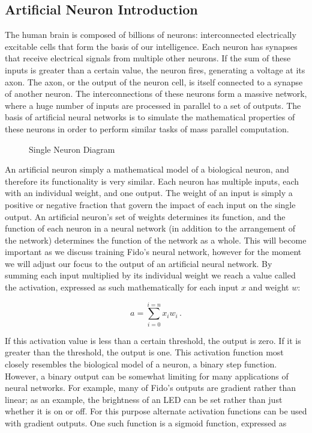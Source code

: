 \subsection{Artificial Neuron Introduction}


The human brain is composed of billions of neurons: interconnected electrically excitable cells that form the basis of our intelligence.  Each neuron has synapses that receive electrical signals from multiple other neurons.  If the sum of these inputs is greater than a certain value, the neuron fires, generating a voltage at its axon.  The axon, or the output of the neuron cell, is itself connected to a synapse of another neuron.  The interconnections of these neurons form a massive network, where a huge number of inputs are processed in parallel to a set of outputs.  The basis of artificial neural networks is to simulate the mathematical properties of these neurons in order to perform similar tasks of mass parallel computation.

\begin{figure}
	\centering
	
	\caption{Single Neuron Diagram}
\end{figure}

An artificial neuron simply a mathematical model of a biological neuron, and therefore its functionality is very similar.  Each neuron has multiple inputs, each with an individual weight, and one output.  The weight of an input is simply a positive or negative fraction that govern the impact of each input on the single output.  An artificial neuron's set of weights determines its function, and the function of each neuron in a neural network (in addition to the arrangement of the network) determines the function of the network as a whole.  This will become important as we discuss training Fido's neural network, however for the moment we will adjust our focus to the output of an artificial neural network.  By summing each input multiplied by its individual weight we reach a value called the activation, expressed as such mathematically for each input $x$ and weight $w$:

\begin{equation}
	a=\sum_{i=0}^{i=n}x_i w_i
	\,.
\end{equation}

If this activation value is less than a certain threshold, the output is zero.  If it is greater than the threshold, the output is one.  This activation function most closely resembles the biological model of a neuron, a binary step function.  However, a binary output can be somewhat limiting for many applications of neural networks.  For example, many of Fido's outputs are gradient rather than linear; as an example, the brightness of an LED can be set rather than just whether it is on or off.  For this purpose alternate activation functions can be used with gradient outputs.  One such function is a sigmoid function, expressed as

